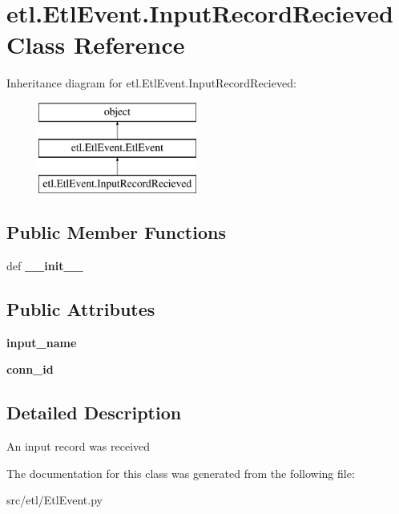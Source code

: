 \hypertarget{classetl_1_1EtlEvent_1_1InputRecordRecieved}{\section{etl.\-Etl\-Event.\-Input\-Record\-Recieved Class Reference}
\label{classetl_1_1EtlEvent_1_1InputRecordRecieved}
}
Inheritance diagram for etl.\-Etl\-Event.\-Input\-Record\-Recieved\-:\begin{figure}[H]
\begin{center}
\leavevmode
\includegraphics[height=3.000000cm]{classetl_1_1EtlEvent_1_1InputRecordRecieved}
\end{center}
\end{figure}
\subsection*{Public Member Functions}
\begin{DoxyCompactItemize}
\item 
\hypertarget{classetl_1_1EtlEvent_1_1InputRecordRecieved_a7282b013ccddb10fe1112b9e4aac7cdd}{def {\bfseries \-\_\-\-\_\-init\-\_\-\-\_\-}}\label{classetl_1_1EtlEvent_1_1InputRecordRecieved_a7282b013ccddb10fe1112b9e4aac7cdd}

\end{DoxyCompactItemize}
\subsection*{Public Attributes}
\begin{DoxyCompactItemize}
\item 
\hypertarget{classetl_1_1EtlEvent_1_1InputRecordRecieved_a5fc64da491760496be540ed6a2cda5c9}{{\bfseries input\-\_\-name}}\label{classetl_1_1EtlEvent_1_1InputRecordRecieved_a5fc64da491760496be540ed6a2cda5c9}

\item 
\hypertarget{classetl_1_1EtlEvent_1_1InputRecordRecieved_af8fccb01a2e7f48b56ffe9a100ac5f64}{{\bfseries conn\-\_\-id}}\label{classetl_1_1EtlEvent_1_1InputRecordRecieved_af8fccb01a2e7f48b56ffe9a100ac5f64}

\end{DoxyCompactItemize}


\subsection{Detailed Description}
\begin{DoxyVerb}An input record was received\end{DoxyVerb}
 

The documentation for this class was generated from the following file\-:\begin{DoxyCompactItemize}
\item 
src/etl/Etl\-Event.\-py\end{DoxyCompactItemize}
